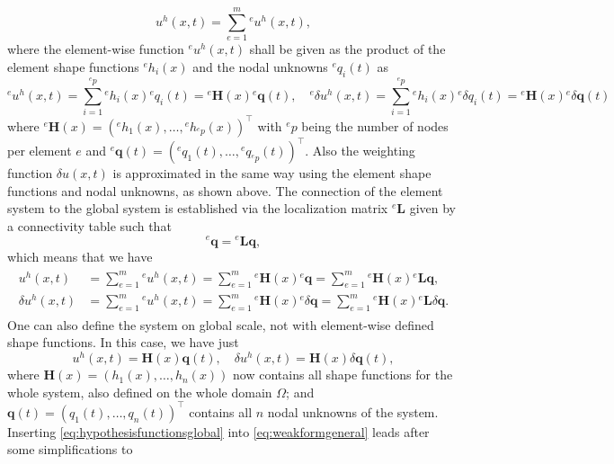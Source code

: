 \documentclass[a4paper,11pt]{article}
\numberwithin{equation}{section}
\newcommand\matr[1]{\ensuremath{\boldsymbol{\mathbf{#1}}}}
\newcommand\vect[1]{\ensuremath{\bm{#1}}}
\begin{document}
{\begin{equation}
u^h(x,t) = \sum_{e=1}^{m}{}^e u^h(x,t),
\end{equation} where the element-wise function ${}^e u^h(x,t)$ shall be given as the product of the element shape functions ${}^e h_i(x)$ and the nodal unknowns ${}^e q_i(t)$ as \begin{equation}\label{eq:hypothesisfunctions}
{}^e u^h(x,t) = \sum_{i=1}^{{}^e p}{}^e h_i(x){}^e q_i(t) = {}^e \vect{H}(x){}^e \vect{q}(t), \quad {}^e \delta u^h(x,t) = \sum_{i=1}^{{}^e p}{}^e h_i(x){}^e \delta q_i(t) = {}^e \vect{H}(x){}^e \delta \vect{q}(t)
\end{equation} where ${}^e \vect{H}(x) = ({}^e h_1(x),\dots,{}^e h_{{}^e p}(x))^\top$ with ${}^e p$ being the number of nodes per element $e$ and ${}^e \vect{q}(t) = ({}^e q_1(t),\dots,{}^e q_{{}^e p}(t))^\top$. Also the weighting function $\delta u(x,t)$ is approximated in the same way using the element shape functions and nodal unknowns, as shown above. The connection of the element system to the global system is established via the localization matrix ${}^e \matr{L}$ given by a connectivity table such that \begin{equation}
{}^e \vect{q} = {}^e \matr{L} \vect{q},
\end{equation} which means that we have \begin{align}
\begin{aligned}
	u^h(x,t) &= \sum_{e=1}^{m}{}^e u^h(x,t) = \sum_{e=1}^{m}{}^e\vect{H}(x){}^e \vect{q} = \sum_{e=1}^{m}{}^e \vect{H}(x){}^e \matr{L} \vect{q}, \\
	\delta u^h(x,t) &= \sum_{e=1}^{m}{}^e u^h(x,t) = \sum_{e=1}^{m}{}^e\vect{H}(x){}^e \delta\vect{q} = \sum_{e=1}^{m}{}^e \vect{H}(x){}^e \matr{L} \delta \vect{q}.
\end{aligned}
\end{align} 
One can also define the system on global scale, not with element-wise defined shape functions. In this case, we have just \begin{equation}\label{eq:hypothesisfunctionsglobal}
	u^h(x,t) = \vect{H}(x)\vect{q}(t), \quad \delta u^h(x,t) = \vect{H}(x)\delta\vect{q}(t),
\end{equation} where $\vect{H}(x) = (h_1(x),\dots,h_n(x))$ now contains all shape functions for the whole system, also defined on the whole domain $\Omega$; and $\vect{q}(t) = (q_1(t),\dots,q_n(t))^\top$ contains all $n$ nodal unknowns of the system. Inserting \cref{eq:hypothesisfunctionsglobal} into \cref{eq:weakformgeneral} leads after some simplifications to \begin{equation}

\end{equation}}
\end{document}
